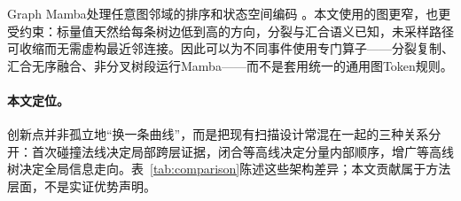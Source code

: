 Graph Mamba处理任意图邻域的排序和状态空间编码 \cite{behrouz2024graphmamba}。本文使用的图更窄，也更受约束：标量值天然给每条树边低到高的方向，分裂与汇合语义已知，未采样路径可收缩而无需虚构最近邻连接。因此可以为不同事件使用专门算子——分裂复制、汇合无序融合、非分叉树段运行Mamba——而不是套用统一的通用图Token规则。

\paragraph{本文定位。}
创新点并非孤立地“换一条曲线”，而是把现有扫描设计常混在一起的三种关系分开：首次碰撞法线决定局部跨层证据，闭合等高线决定分量内部顺序，增广等高线树决定全局信息走向。表~\ref{tab:comparison}陈述这些架构差异；本文贡献属于方法层面，不是实证优势声明。
